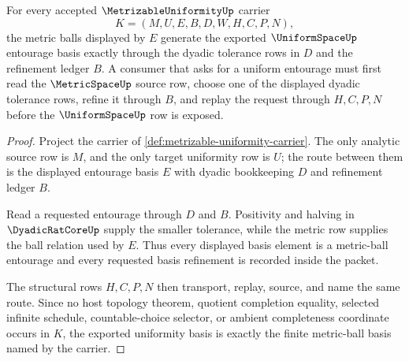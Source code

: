 \begin{theorem}
\label{thm:metrizable-uniformity-entourage-basis}
For every accepted $\MetrizableUniformityUp$ carrier
$$
K=(M,U,E,B,D,W,H,C,P,N),
$$
the metric balls displayed by $E$ generate the exported $\UniformSpaceUp$ entourage basis exactly through the dyadic tolerance rows in $D$ and the refinement ledger $B$. A consumer that asks for a uniform entourage must first read the $\MetricSpaceUp$ source row, choose one of the displayed dyadic tolerance rows, refine it through $B$, and replay the request through $H,C,P,N$ before the $\UniformSpaceUp$ row is exposed.
\end{theorem}
\begin{proof}
Project the carrier of \autoref{def:metrizable-uniformity-carrier}. The only analytic source row is $M$, and the only target uniformity row is $U$; the route between them is the displayed entourage basis $E$ with dyadic bookkeeping $D$ and refinement ledger $B$.

Read a requested entourage through $D$ and $B$. Positivity and halving in $\DyadicRatCoreUp$ supply the smaller tolerance, while the metric row supplies the ball relation used by $E$. Thus every displayed basis element is a metric-ball entourage and every requested basis refinement is recorded inside the packet.

The structural rows $H,C,P,N$ then transport, replay, source, and name the same route. Since no host topology theorem, quotient completion equality, selected infinite schedule, countable-choice selector, or ambient completeness coordinate occurs in $K$, the exported uniformity basis is exactly the finite metric-ball basis named by the carrier.
\end{proof}

